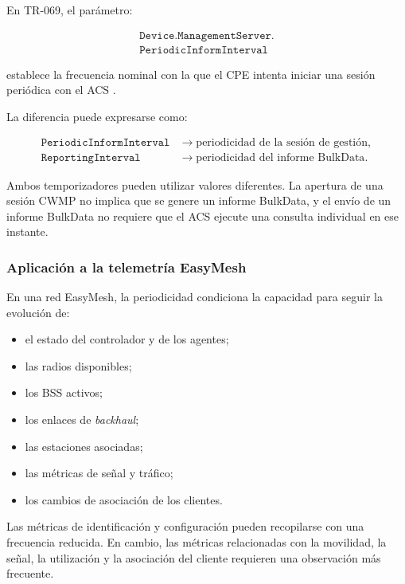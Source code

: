 En TR-069, el parámetro:

\[
\begin{split}
    \texttt{Device.ManagementServer.}\\
    \texttt{PeriodicInformInterval}
\end{split}
\]

establece la frecuencia nominal con la que el CPE intenta iniciar una
sesión periódica con el ACS \cite{bbf_tr069}.

La diferencia puede expresarse como:

\[
\begin{aligned}
    \texttt{PeriodicInformInterval}
    &\longrightarrow
    \text{periodicidad de la sesión de gestión},\\
    \texttt{ReportingInterval}
    &\longrightarrow
    \text{periodicidad del informe BulkData}.
\end{aligned}
\]

Ambos temporizadores pueden utilizar valores diferentes. La apertura de
una sesión CWMP no implica que se genere un informe BulkData, y el envío
de un informe BulkData no requiere que el ACS ejecute una consulta
individual en ese instante.


\subsubsection*{Aplicación a la telemetría EasyMesh}

En una red EasyMesh, la periodicidad condiciona la capacidad para seguir
la evolución de:

\begin{itemize}
    \item el estado del controlador y de los agentes;
    \item las radios disponibles;
    \item los BSS activos;
    \item los enlaces de \textit{backhaul};
    \item las estaciones asociadas;
    \item las métricas de señal y tráfico;
    \item los cambios de asociación de los clientes.
\end{itemize}

Las métricas de identificación y configuración pueden recopilarse con una
frecuencia reducida. En cambio, las métricas relacionadas con la
movilidad, la señal, la utilización y la asociación del cliente requieren
una observación más frecuente.


